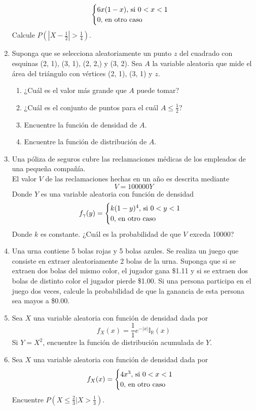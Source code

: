 \documentclass[12pt,a4paper]{report}
\begin{document}
\begin{enumerate}
{\[\begin{cases}
										6x(1-x), $ si $ 0 < x < 1\\
										0, $ en otro caso$
									 \end{cases}
				\]
			Calcule $P(|X-\frac{1}{2}| > \frac{1}{4})$.
		}
		\item {
			Suponga que se selecciona aleatoriamente un punto $z$ del cuadrado con
			esquinas (2, 1), (3, 1), (2, 2,) y (3, 2). Sea $A$ la variable aleatoria
			que mide el área del triángulo con vértices (2, 1), (3, 1) y $z$.
			\begin{enumerate}
				\item {
					¿Cuál es el valor más grande que $A$ puede tomar?
				}
				\item {
					¿Cuál es el conjunto de puntos para el cuál $A \leq \frac{1}{2}$?
				}
				\item {
					Encuentre la función de densidad de $A$.
				}
				\item {
					Encuentre la función de distribución de $A$.
				}
			\end{enumerate}
		}
		\item {
			Una póliza de seguros cubre las reclamaciones médicas de los empleados
			de una pequeña compañía.\\
			El valor $V$ de las reclamaciones hechas en un año es descrita mediante
			\[V = 100000Y\]
			Donde $Y$ es una variable aleatoria con función de densidad
			\[
				f_\gamma(y) = \begin{cases}
												k(1-y)^4, $ si $ 0 < y < 1\\
												0, $ en otro caso$
											\end{cases}
			\]
			Donde $k$ es constante. ¿Cuál es la probabilidad de que $V$ exceda 10000?
			}
		\item {
			Una urna contiene 5 bolas rojas y 5 bolas azules. Se realiza un juego
			que consiste en extraer aleatoriamente 2 bolas de la urna. Suponga que
			si se extraen dos bolas del mismo color, el jugador gana \$1.11 y si se
			extraen dos bolas de distinto color el jugador pierde \$1.00. Si una
			persona participa en el juego dos veces, calcule la probabilidad de que
			la ganancia de esta persona sea mayos a \$0.00.
		}
		\item {
			Sea $X$ una variable aleatoria con función de densidad dada por
			\[f_X(x) = \frac{1}{1}e^{-|x|}\mathbb{I}_{\mathbb{R}}(x)\]
			Si $Y = X^2$, encuentre la función de distribución acumulada de $Y$.
		}
		\item {
			Sea $X$ una variable aleatoria con función de densidad dada por
			\[
				f_X(x) = \begin{cases}
									4x^3, $ si $ 0 < x < 1\\
									0, $ en otro caso$
								 \end{cases}
			\]
			Encuentre $P(X \leq \frac{2}{3}|X > \frac{1}{3})$.
		}
	\end{enumerate}
\end{document}
